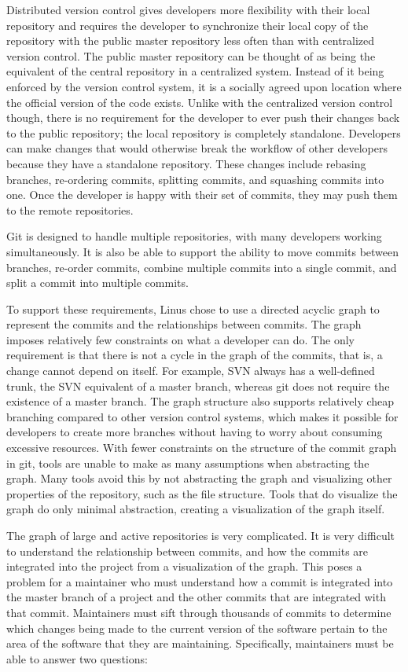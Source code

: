 Distributed version control gives developers more flexibility with their
local repository and requires the developer to synchronize their local
copy of the repository with the public master repository less often
than with centralized version control.
The public master repository can be thought of as being the equivalent
of the central repository in a centralized system.
Instead of it being enforced by the version control system,
it is a socially agreed upon location where the official version of the
code exists.
Unlike with the centralized version control though,
there is no requirement for the developer to ever push their changes
back to the public repository;
the local repository is completely standalone.
Developers can make changes that would otherwise break the workflow of
other developers because they have a standalone repository.
These changes include rebasing branches, re-ordering commits,
splitting commits, and squashing commits into one.
Once the developer is happy with their set of commits, they may push
them to the remote repositories.

Git is designed to handle multiple repositories, with many
developers working simultaneously.
It is also be able to support the ability to move commits between
branches, re-order commits, combine multiple commits into a single
commit, and split a commit into multiple commits.

To support these requirements, Linus chose to use a directed acyclic
graph to represent the commits and the relationships between commits.
The graph imposes relatively few constraints on what a developer can do.
The only requirement is that there is not a cycle in the graph of the commits,
that is, a change cannot depend on itself.
For example, SVN always has a well-defined trunk, the SVN equivalent of
a master branch, whereas git does not require the existence of a master
branch.
The graph structure also supports relatively cheap branching compared to
other version control systems, which makes it possible for developers to
create more branches without having to worry about consuming excessive
resources.
With fewer constraints on the structure of the commit graph in git,
tools are unable to make as many assumptions when abstracting the graph.
Many tools avoid this by not abstracting the graph and visualizing other
properties of the repository, such as the file structure.
Tools that do visualize the graph do only minimal abstraction, creating
a visualization of the graph itself.

The graph of large and active repositories is very complicated.
It is very difficult to understand the relationship between commits, and
how the commits are integrated into the project from a visualization of
the graph.
This poses a problem for a maintainer who must understand how a
commit is integrated into the master branch of a
project and the other commits that are integrated with that commit.
Maintainers must sift through thousands of commits to determine which
changes being made to the current version of the software pertain to
the area of the software that they are maintaining.
Specifically, maintainers must be able to answer two questions:

